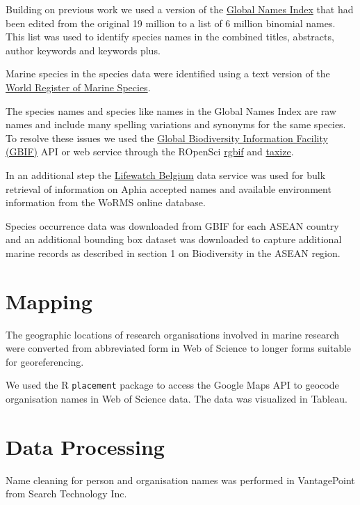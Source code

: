 \documentclass[]{book}
\theoremstyle{definition}
\theoremstyle{definition}
\theoremstyle{definition}
\theoremstyle{remark}
\begin{document}
Building on previous work we used a version of the
\href{http://gni.globalnames.org/}{Global Names Index} that had been
edited from the original 19 million to a list of 6 million binomial
names. This list was used to identify species names in the combined
titles, abstracts, author keywords and keywords plus.

Marine species in the species data were identified using a text version
of the \href{http://www.marinespecies.org/}{World Register of Marine
Species}.

The species names and species like names in the Global Names Index are
raw names and include many spelling variations and synonyms for the same
species. To resolve these issues we used the
\href{https://www.gbif.org/}{Global Biodiversity Information Facility
(GBIF)} API or web service through the ROpenSci \href{}{rgbif} and
\href{}{taxize}.

In an additional step the
\href{http://www.lifewatch.be/data-services/?cache=1521050271}{Lifewatch
Belgium} data service was used for bulk retrieval of information on
Aphia accepted names and available environment information from the
WoRMS online database.

Species occurrence data was downloaded from GBIF for each ASEAN country
and an additional bounding box dataset was downloaded to capture
additional marine records as described in section 1 on Biodiversity in
the ASEAN region.

\hypertarget{mapping}{%
\section{Mapping}\label{mapping}}

The geographic locations of research organisations involved in marine
research were converted from abbreviated form in Web of Science to
longer forms suitable for georeferencing.

We used the R \texttt{placement} package to access the Google Maps API
to geocode organisation names in Web of Science data. The data was
visualized in Tableau.

\hypertarget{data-processing}{%
\section{Data Processing}\label{data-processing}}

Name cleaning for person and organisation names was performed in
VantagePoint from Search Technology Inc.
\end{document}

